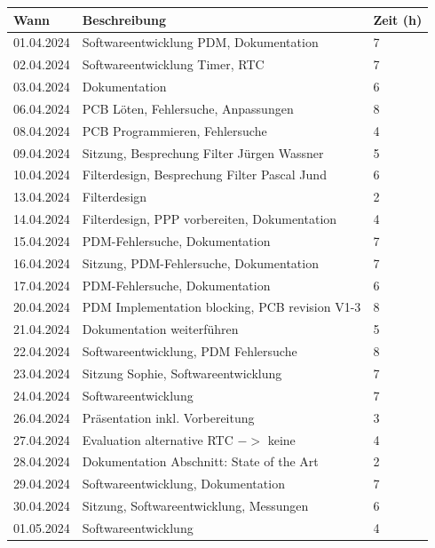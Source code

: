 \documentclass[12pt]{article}
\begin{document}
	\begin{table}[H]
		\centering
		\begin{tabular}{|l|p{}|l|}
			\hline
			\textbf{Wann} & \textbf{Beschreibung} & \textbf{Zeit (h)} \\ \hline
			01.04.2024 & Softwareentwicklung PDM, Dokumentation & 7 \\ \hline
			02.04.2024 & Softwareentwicklung Timer, RTC & 7 \\ \hline
			03.04.2024 & Dokumentation & 6 \\ \hline
			06.04.2024 & PCB Löten, Fehlersuche, Anpassungen & 8 \\ \hline
			08.04.2024 & PCB Programmieren, Fehlersuche & 4 \\ \hline
			09.04.2024 & Sitzung, Besprechung Filter Jürgen Wassner & 5 \\ \hline
			10.04.2024 & Filterdesign, Besprechung Filter Pascal Jund & 6 \\ \hline
			13.04.2024 & Filterdesign & 2 \\ \hline
			14.04.2024 & Filterdesign, PPP vorbereiten, Dokumentation & 4 \\ \hline
			15.04.2024 & PDM-Fehlersuche, Dokumentation & 7 \\ \hline
			16.04.2024 & Sitzung, PDM-Fehlersuche, Dokumentation & 7 \\ \hline
			17.04.2024 & PDM-Fehlersuche, Dokumentation & 6 \\ \hline
			20.04.2024 & PDM Implementation blocking, PCB revision V1-3 & 8 \\ \hline
			21.04.2024 & Dokumentation weiterführen & 5 \\ \hline
			22.04.2024 & Softwareentwicklung, PDM Fehlersuche & 8 \\ \hline
			23.04.2024 & Sitzung Sophie, Softwareentwicklung & 7 \\ \hline
			24.04.2024 & Softwareentwicklung & 7 \\ \hline
			26.04.2024 & Präsentation inkl. Vorbereitung & 3 \\ \hline
			27.04.2024 & Evaluation alternative RTC $->$ keine & 4 \\ \hline
			28.04.2024 & Dokumentation Abschnitt: State of the Art & 2 \\ \hline
			29.04.2024 & Softwareentwicklung, Dokumentation & 7 \\ \hline
			30.04.2024 & Sitzung, Softwareentwicklung, Messungen & 6 \\ \hline
			01.05.2024 & Softwareentwicklung & 4 \\ \hline

\end{tabular}
\end{table}
\end{document}
